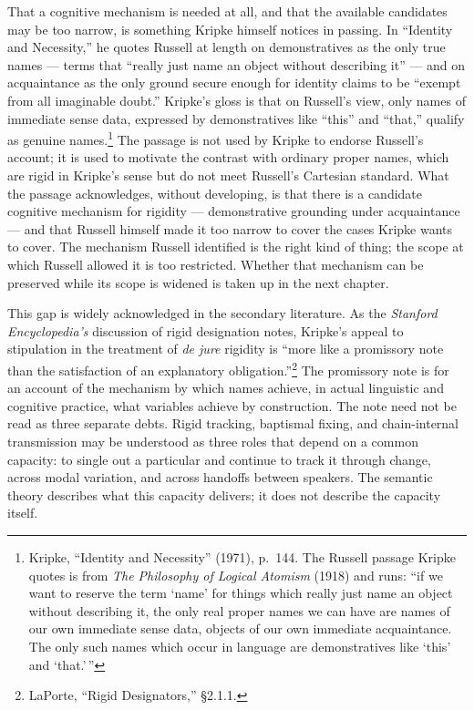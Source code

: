 \documentclass[12pt,a4paper]{article}
\begin{document}
That a cognitive mechanism is needed at all, and that the available candidates may be too narrow, is something Kripke himself notices in passing. In ``Identity and Necessity,'' he quotes Russell at length on demonstratives as the only true names --- terms that ``really just name an object without describing it'' --- and on acquaintance as the only ground secure enough for identity claims to be ``exempt from all imaginable doubt.'' Kripke's gloss is that on Russell's view, only names of immediate sense data, expressed by demonstratives like ``this'' and ``that,'' qualify as genuine names.\footnote{Kripke, ``Identity and Necessity'' (1971), p.~144. The Russell passage Kripke quotes is from \emph{The Philosophy of Logical Atomism} (1918) and runs: ``if we want to reserve the term `name' for things which really just name an object without describing it, the only real proper names we can have are names of our own immediate sense data, objects of our own immediate acquaintance. The only such names which occur in language are demonstratives like `this' and `that.'\,''} The passage is not used by Kripke to endorse Russell's account; it is used to motivate the contrast with ordinary proper names, which are rigid in Kripke's sense but do not meet Russell's Cartesian standard. What the passage acknowledges, without developing, is that there is a candidate cognitive mechanism for rigidity --- demonstrative grounding under acquaintance --- and that Russell himself made it too narrow to cover the cases Kripke wants to cover. The mechanism Russell identified is the right kind of thing; the scope at which Russell allowed it is too restricted. Whether that mechanism can be preserved while its scope is widened is taken up in the next chapter.

This gap is widely acknowledged in the secondary literature. As the \emph{Stanford Encyclopedia's} discussion of rigid designation notes, Kripke's appeal to stipulation in the treatment of \emph{de jure} rigidity is ``more like a promissory note than the satisfaction of an explanatory obligation.''\footnote{LaPorte, ``Rigid Designators,'' §2.1.1.} The promissory note is for an account of the mechanism by which names achieve, in actual linguistic and cognitive practice, what variables achieve by construction. The note need not be read as three separate debts. Rigid tracking, baptismal fixing, and chain-internal transmission may be understood as three roles that depend on a common capacity: to single out a particular and continue to track it through change, across modal variation, and across handoffs between speakers. The semantic theory describes what this capacity delivers; it does not describe the capacity itself.
\end{document}
